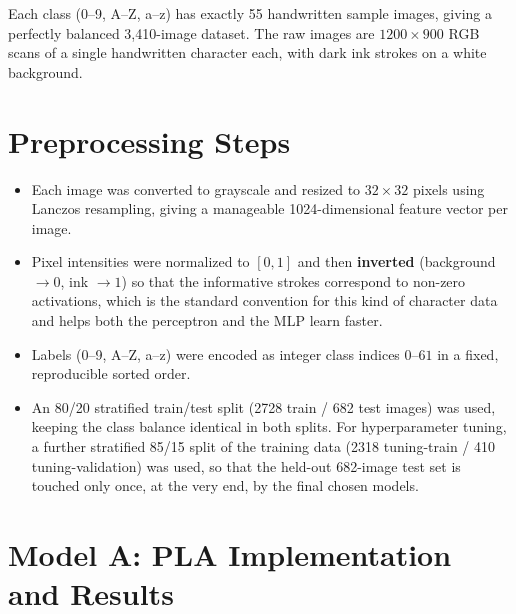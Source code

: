 \documentclass[12pt,a4paper]{article}
\begin{document}
Each class (0--9, A--Z, a--z) has exactly 55 handwritten sample images, giving a perfectly balanced
3{,}410-image dataset. The raw images are $1200\times900$ RGB scans of a single handwritten character
each, with dark ink strokes on a white background.

\section{Preprocessing Steps}
\begin{itemize}
\item Each image was converted to grayscale and resized to $32\times32$ pixels using Lanczos
resampling, giving a manageable 1024-dimensional feature vector per image.
\item Pixel intensities were normalized to $[0,1]$ and then \textbf{inverted} (background $\to 0$,
ink $\to 1$) so that the informative strokes correspond to non-zero activations, which is the
standard convention for this kind of character data and helps both the perceptron and the MLP learn
faster.
\item Labels (0--9, A--Z, a--z) were encoded as integer class indices $0$--$61$ in a fixed,
reproducible sorted order.
\item An 80/20 stratified train/test split (2728 train / 682 test images) was used, keeping the class
balance identical in both splits. For hyperparameter tuning, a further stratified 85/15 split of the
training data (2318 tuning-train / 410 tuning-validation) was used, so that the held-out 682-image
test set is touched only once, at the very end, by the final chosen models.
\end{itemize}

\section{Model A: PLA Implementation and Results}
\end{document}

